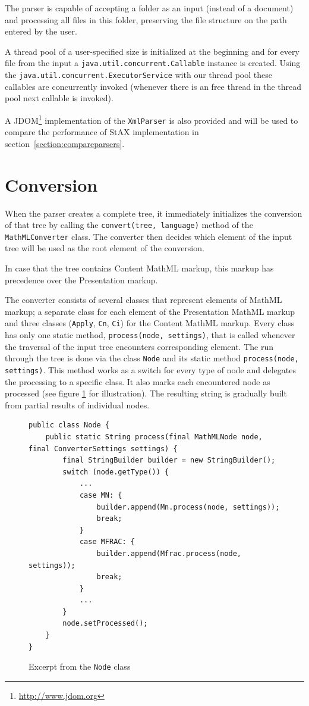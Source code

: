 \documentclass[11pt,oneside,final]{fithesis2}
\begin{document}
The parser is capable of accepting a folder as an input (instead of a document) and processing all files in this folder, preserving the file structure on the path entered by the user. 

A thread pool of a user-specified size is initialized at the beginning and for every file from the input a \texttt{java.util.concurrent.Callable} instance is created. Using the \texttt{java.util.concurrent.ExecutorService} with our thread pool these callables are concurrently invoked (whenever there is an free thread in the thread pool next callable is invoked). 

A JDOM\footnote{\url{http://www.jdom.org}} implementation of the \texttt{XmlParser} is also provided and will be used to compare the performance of StAX implementation in section~\vref{section:compareparsers}.

\section{Conversion}
When the parser creates a complete tree, it immediately initializes the conversion of that tree by calling the \texttt{convert(tree, language)} method of the \texttt{MathMLConverter} class. The converter then decides which element of the input tree will be used as the root element of the conversion. 

In case that the tree contains Content MathML markup, this markup has precedence over the Presentation markup. 

The converter consists of several classes that represent elements of MathML markup; a separate class for each element of the Presentation MathML markup and three classes (\texttt{Apply}, \texttt{Cn}, \texttt{Ci}) for the Content MathML markup. Every class has only one static method, \texttt{process(node, settings)}, that is called whenever the traversal of the input tree encounters corresponding element. The run through the tree is done via the class \texttt{Node} and its static method \texttt{process(node, settings)}. This method works as a switch for every type of node and delegates the processing to a specific class. It also marks each encountered node as processed (see figure \ref{fig:converter-node} for illustration). The resulting string is gradually built from partial results of individual nodes.

\begin{figure}[!ht]
\begin{lstlisting}
public class Node {
	public static String process(final MathMLNode node, final ConverterSettings settings) {
		final StringBuilder builder = new StringBuilder();
        switch (node.getType()) {
            ...
            case MN: {
                builder.append(Mn.process(node, settings));
                break;
            }
            case MFRAC: {    
                builder.append(Mfrac.process(node, settings));
                break;
            }
            ...
        }
        node.setProcessed();
    }    
}
\end{lstlisting}
\caption{Excerpt from the \texttt{Node} class}
\label{fig:converter-node}
\end{figure}
\end{document}
